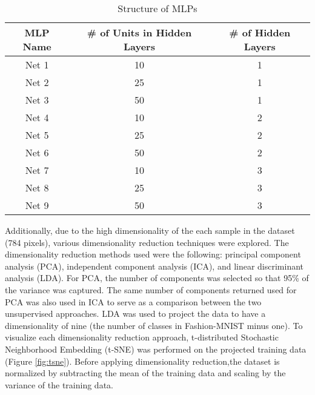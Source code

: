 \documentclass[conference]{IEEEtran}
\begin{document}
\begin{table}[t]
	\centering
	\caption{Structure of MLPs}
	\begin{tabular}{|c|c|c|}
		\hline
		MLP Name & \# of Units in Hidden Layers & \# of Hidden Layers \\ \hline
		Net 1    & 10                           & 1                   \\ \hline
		Net 2    & 25                           & 1                   \\ \hline
		Net 3    & 50                           & 1                   \\ \hline
		Net 4    & 10                           & 2                   \\ \hline
		Net 5    & 25                           & 2                   \\ \hline
		Net 6    & 50                           & 2                   \\ \hline
		Net 7    & 10                           & 3                   \\ \hline
		Net 8    & 25                           & 3                   \\ \hline
		Net 9    & 50                           & 3                   \\ \hline
	\end{tabular}
	\label{Struct}
\end{table}
	
	Additionally, due to the high dimensionality of the each sample in the dataset (784 pixels), various dimensionality reduction techniques were explored. The dimensionality reduction methods used were the following: principal component analysis (PCA), independent component analysis (ICA), and linear discriminant analysis (LDA). For PCA, the number of components was selected so that 95\% of the variance was captured. The same number of components returned used for PCA was also used in ICA to serve as a comparison between the two unsupervised approaches. LDA was used to project the data to have a dimensionality of nine (the number of classes in Fashion-MNIST minus one). To visualize each dimensionality reduction approach, t-distributed Stochastic Neighborhood Embedding (t-SNE) was performed on the projected training data (Figure \ref{fig:tsne}).
	Before applying dimensionality reduction,the dataset is normalized by subtracting the mean of the training data and scaling by the variance of the training data.  
	
\end{document}
